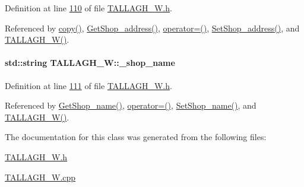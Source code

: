 Definition at line \hyperlink{_t_a_l_l_a_g_h___w_8h_source_l00110}{110} of file \hyperlink{_t_a_l_l_a_g_h___w_8h_source}{T\+A\+L\+L\+A\+G\+H\+\_\+\+W.\+h}.



Referenced by \hyperlink{_t_a_l_l_a_g_h___w_8cpp_source_l00035}{copy()}, \hyperlink{_t_a_l_l_a_g_h___w_8cpp_source_l00127}{Get\+Shop\+\_\+address()}, \hyperlink{_t_a_l_l_a_g_h___w_8h_source_l00075}{operator=()}, \hyperlink{_t_a_l_l_a_g_h___w_8cpp_source_l00123}{Set\+Shop\+\_\+address()}, and \hyperlink{_t_a_l_l_a_g_h___w_8h_source_l00024}{T\+A\+L\+L\+A\+G\+H\+\_\+\+W()}.

\paragraph[{\texorpdfstring{\+\_\+shop\+\_\+name}{_shop_name}}]{\setlength{\rightskip}{0pt plus 5cm}std\+::string T\+A\+L\+L\+A\+G\+H\+\_\+\+W\+::\+\_\+shop\+\_\+name\hspace{0.3cm}{\ttfamily [private]}}\hypertarget{class_t_a_l_l_a_g_h___w_a2d63785f290e8be76f3c4543e5df9508_a2d63785f290e8be76f3c4543e5df9508}{}\label{class_t_a_l_l_a_g_h___w_a2d63785f290e8be76f3c4543e5df9508_a2d63785f290e8be76f3c4543e5df9508}


Definition at line \hyperlink{_t_a_l_l_a_g_h___w_8h_source_l00111}{111} of file \hyperlink{_t_a_l_l_a_g_h___w_8h_source}{T\+A\+L\+L\+A\+G\+H\+\_\+\+W.\+h}.



Referenced by \hyperlink{_t_a_l_l_a_g_h___w_8cpp_source_l00119}{Get\+Shop\+\_\+name()}, \hyperlink{_t_a_l_l_a_g_h___w_8h_source_l00075}{operator=()}, \hyperlink{_t_a_l_l_a_g_h___w_8cpp_source_l00115}{Set\+Shop\+\_\+name()}, and \hyperlink{_t_a_l_l_a_g_h___w_8h_source_l00024}{T\+A\+L\+L\+A\+G\+H\+\_\+\+W()}.



The documentation for this class was generated from the following files\+:\begin{DoxyCompactItemize}
\item 
\hyperlink{_t_a_l_l_a_g_h___w_8h}{T\+A\+L\+L\+A\+G\+H\+\_\+\+W.\+h}\item 
\hyperlink{_t_a_l_l_a_g_h___w_8cpp}{T\+A\+L\+L\+A\+G\+H\+\_\+\+W.\+cpp}\end{DoxyCompactItemize}
